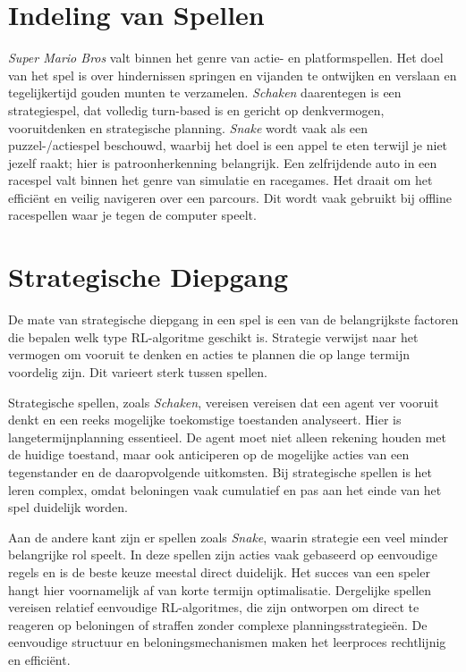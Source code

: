 \documentclass[a4paper,12pt]{report}
\begin{document}
\section{Indeling van Spellen}
\textit{Super Mario Bros} valt binnen het genre van actie- en platformspellen. Het doel van het spel is over hindernissen springen en vijanden te ontwijken en verslaan en tegelijkertijd gouden munten te verzamelen. \textit{Schaken} daarentegen is een strategiespel, dat volledig turn-based is en gericht op denkvermogen, vooruitdenken en strategische planning. \textit{Snake} wordt vaak als een puzzel-/actiespel beschouwd, waarbij het doel is een appel te eten terwijl je niet jezelf raakt; hier is patroonherkenning belangrijk. Een zelfrijdende auto in een racespel valt binnen het genre van simulatie en racegames. Het draait om het efficiënt en veilig navigeren over een parcours. Dit wordt vaak gebruikt bij offline racespellen waar je tegen de computer speelt.

\section{Strategische Diepgang}
De mate van strategische diepgang in een spel is een van de belangrijkste
factoren die bepalen welk type RL-algoritme geschikt is. Strategie verwijst
naar het vermogen om vooruit te denken en acties te plannen die op lange
termijn voordelig zijn. Dit varieert sterk tussen spellen.

Strategische spellen, zoals \textit{Schaken}, vereisen vereisen dat een agent
ver vooruit denkt en een reeks mogelijke toekomstige toestanden analyseert.
Hier is langetermijnplanning essentieel. De agent moet niet alleen rekening
houden met de huidige toestand, maar ook anticiperen op de mogelijke acties van
een tegenstander en de daaropvolgende uitkomsten. Bij strategische spellen is
het leren complex, omdat beloningen vaak cumulatief en pas aan het einde van
het spel duidelijk worden.

Aan de andere kant zijn er spellen zoals \textit{Snake}, waarin strategie een
veel minder belangrijke rol speelt. In deze spellen zijn acties vaak gebaseerd
op eenvoudige regels en is de beste keuze meestal direct duidelijk. Het succes
van een speler hangt hier voornamelijk af van korte termijn optimalisatie.
Dergelijke spellen vereisen relatief eenvoudige RL-algoritmes, die zijn
ontworpen om direct te reageren op beloningen of straffen zonder complexe
planningsstrategieën. De eenvoudige structuur en beloningsmechanismen maken het
leerproces rechtlijnig en efficiënt.
\end{document}
